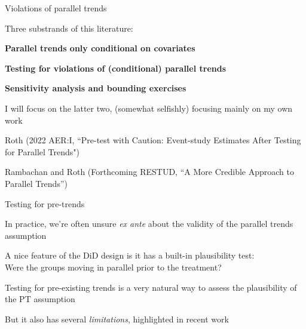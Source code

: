 \documentclass[aspectratio = 169, 13pt]{beamer}
\begin{document}
\begin{frame}{Violations of parallel trends}
	\begin{wideitemize}
		
		
		\item
		Three substrands of this literature: \\
		\medskip 
		\begin{wideitemize}
			
			{\normalsize
				\item
				\textbf{Parallel trends only conditional on covariates} \\
				
				\item
				\textbf{Testing for violations of (conditional) parallel trends}\\
				
				\item
				\textbf{Sensitivity analysis and bounding exercises}
			}
			
		\end{wideitemize}
		
		\item
		I will focus on the latter two, (somewhat selfishly) focusing mainly on my own work
		\begin{wideitemize}
			\item
			Roth (2022 AER:I, ``Pre-test with Caution: Event-study Estimates After Testing for Parallel Trends") 
			\item
			Rambachan and Roth (Forthcoming RESTUD, ``A More Credible Approach to Parallel Trends'') 
		\end{wideitemize}
		
		
		
	\end{wideitemize}
\end{frame}


\begin{frame}{Testing for pre-trends}
	
	\begin{wideitemize}
		\item
		In practice, we're often unsure \textit{ex ante} about the validity of the parallel trends assumption
		    
		\item
		A nice feature of the DiD design is it has a built-in plausibility test:\\
		Were the groups moving in parallel prior to the treatment? 
		    
		\item
		Testing for pre-existing trends is a very natural way to assess the plausibility of the PT assumption
		    
		\item
		But it also has several \textit{limitations}, highlighted in recent work \citep[][]{freyaldenhoven_pre-event_2019, kahn-lang_promise_2020, bilinski_seeking_2018, roth_pre-test_2021}
	\end{wideitemize}
	    
\end{frame}
\end{document}
